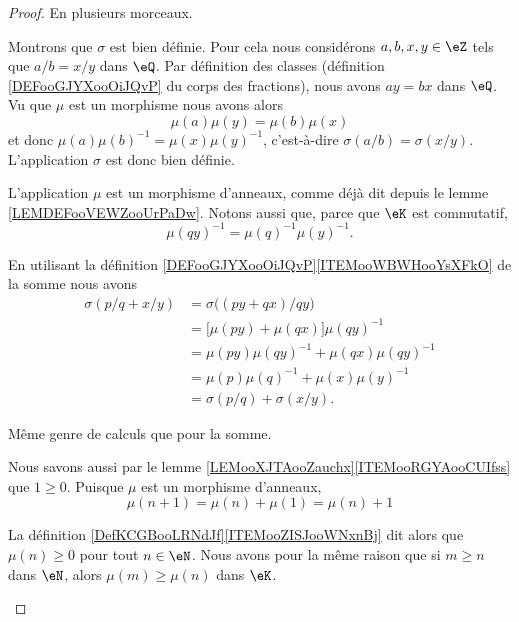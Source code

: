 \begin{proof}
	En plusieurs morceaux.
	\begin{subproof}
		Montrons que \( \sigma\) est bien définie. Pour cela nous considérons \( a,b,x,y\in \eZ\) tels que \( a/b=x/y\) dans \( \eQ\). Par définition des classes (définition \ref{DEFooGJYXooOiJQvP} du corps des fractions), nous avons \( ay=bx\) dans \( \eQ\). Vu que \( \mu\) est un morphisme nous avons alors
		\begin{equation}
			\mu(a)\mu(y)=\mu(b)\mu(x)
		\end{equation}
		et donc \( \mu(a)\mu(b)^{-1}=\mu(x)\mu(y)^{-1}\), c'est-à-dire \( \sigma(a/b)=\sigma(x/y)\). L'application \( \sigma\) est donc bien définie.


		L'application \( \mu\) est un morphisme d'anneaux, comme déjà dit depuis le lemme \ref{LEMDEFooVEWZooUrPaDw}. Notons aussi que, parce que \( \eK\) est commutatif,
		\begin{equation}
			\mu(qy)^{-1}=\mu(q)^{-1}\mu(y)^{-1}.
		\end{equation}

		En utilisant la définition \ref{DEFooGJYXooOiJQvP}\ref{ITEMooWBWHooYsXFkO} de la somme nous avons
		\begin{subequations}
			\begin{align}
				\sigma(p/q+x/y) & =\sigma\big( (py+qx)/qy \big)            \\
				                & =\big[ \mu(py)+\mu(qx) \big]\mu(qy)^{-1} \\
				                & =\mu(py)\mu(qy)^{-1}+\mu(qx)\mu(qy)^{-1} \\
				                & =\mu(p)\mu(q)^{-1}+\mu(x)\mu(y)^{-1}     \\
				                & =\sigma(p/q)+\sigma(x/y).
			\end{align}
		\end{subequations}

		Même genre de calculs que pour la somme.
		\spitem[Croissante]

		Nous savons aussi par le lemme \ref{LEMooXJTAooZauchx}\ref{ITEMooRGYAooCUIfss} que \( 1\geq 0\). Puisque \( \mu\) est un morphisme d'anneaux,
		\begin{equation}
			\mu(n+1)=\mu(n)+\mu(1)=\mu(n)+1
		\end{equation}

		La définition \ref{DefKCGBooLRNdJf}\ref{ITEMooZISJooWNxnBj} dit alors que \( \mu(n)\geq 0\) pour tout \( n\in \eN\). Nous avons pour la même raison que si \( m\geq n\) dans \( \eN\), alors \( \mu(m)\geq\mu(n)\) dans \( \eK\).


\end{subproof}
\end{proof}
